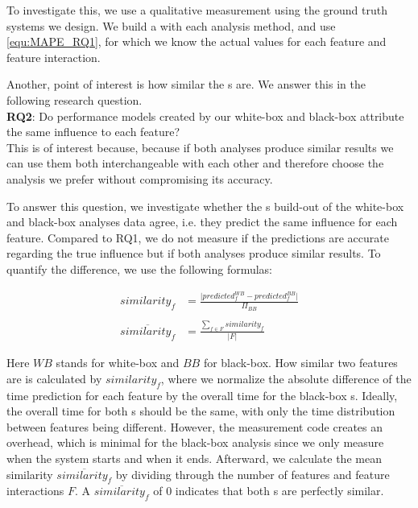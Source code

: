 To investigate this, we use a qualitative measurement using the ground truth systems we design. 
We build a {\perfInfluenceModel} with each analysis method, and use \autoref{equ:MAPE_RQ1}, for which
we know the actual values for each feature and feature interaction.

Another, point of interest is how similar the {\perfInfluenceModel}s are. We answer this in the following research question.\\

\noindent \textbf{RQ2}: Do performance models created by our white-box and black-box attribute the same influence to each feature?\\

This is of interest because, because if both analyses produce similar results we can use them both interchangeable with each other and 
therefore choose the analysis we prefer without compromising its accuracy.

To answer this question, we investigate whether the {\perfInfluenceModel}s build-out of the white-box and black-box analyses data agree, i.e.
they predict the same influence for each feature. 
Compared to RQ1, we do not measure if the predictions are accurate regarding the true influence but if both analyses produce similar results. 
To quantify the difference, we use the following formulas:

\begin{align}
    similarity_f &= \frac{\lvert predicted^{WB}_{f} - predicted^{BB}_{f} \rvert}{\Pi_{BB}} \label{equ:APE_RQ1} \\ \nonumber \\
    \overline{similarity_f}  &=  \frac{\sum_{f \in F} similarity_f}{\lvert F \rvert} \label{equ:MAPE_RQ1}
\end{align}

Here $WB$ stands for white-box and $BB$ for black-box. How similar two features are is calculated by $similarity_f$, 
where we normalize the absolute difference of the time prediction for each feature by the overall time for the black-box {\perfInfluenceModel}s. 
Ideally, the overall time for both {\perfInfluenceModel}s should be the same, with only the time distribution between features being different. 
However, the measurement code creates an overhead, which is minimal for the black-box analysis since we only measure when the system starts and when it ends.
Afterward, we calculate the mean similarity $\overline{similarity_f}$ by dividing through the number of features and feature interactions $F$. 
A $\overline{similarity_f}$ of 0 indicates that both {\perfInfluenceModel}s are perfectly similar.

